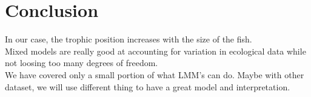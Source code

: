 \documentclass{article}
\begin{document}
\section{Conclusion}
In our case, the trophic position increases with the size of the fish.\\

Mixed models are really good at accounting for variation in ecological data while not loosing too many degrees of freedom.\\
We have covered only a small portion of what LMM's can do. Maybe with other dataset, we will use different thing to have a great model and interpretation.

\newpage

\nocite{*}

\end{document}
